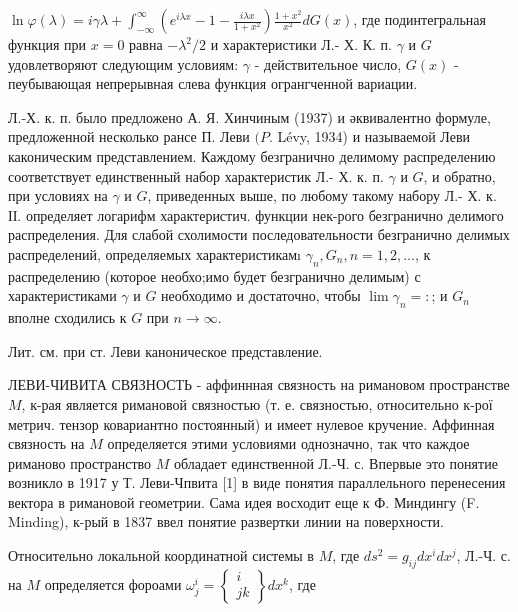 \documentclass[10pt]{article}
\begin{document}
$\ln \varphi(\lambda)=i \gamma \lambda+\int_{-\infty}^{\infty}\left(e^{i \lambda x}-1-\frac{i \lambda x}{1+x^{2}}\right) \frac{1+x^{2}}{x^{2}} d G(x)$, где подинтегральная функция при $x=0$ равна $-\lambda^{2} / 2$ и характеристики Л.- Х. К. п. $\gamma$ и $G$ удовлетворяют следующим условиям: $\gamma$ - действительное число, $G(x)$ - пеубывающая непрерывная слева функция огрангченной вариации.



Л.-Х. к. п. было предложено А. Я. Хинчиным (1937) и әквивалентно формуле, предложенной несколько рансе П. Леви $(P$. Lévy, 1934) и называемой Леви каконическим представлением. Каждому безгранично делимому распределению соответствует единственный набор характеристик Л.- Х. к. п. $\gamma$ и $G$, и обратно, при условиях на $\gamma$ и $G$, приведенных выше, по любому такому набору Л.- Х. к. ІІ. определяет логарифм характеристич. функции нек-рого безгранично делимого распределения. Для слабой схолимости последовательности безгранично делимых распределений, определяемых характеристикамı $\gamma_{n}, G_{n}, n=1,2, \ldots$, к распределению (которое необхо;имо будет безгранично делимым) с характеристиками $\gamma$ и $G$ необходимо и достаточно, чтобы $\lim \gamma_{n}=:$; и $G_{n}$ вполне сходились к $G$ при $n \rightarrow \infty$.



Лит. см. при ст. Леви каноническое представление.



ЛЕВИ-ЧИВИТА СВЯЗНОСТЬ - аффиннная связность на римановом пространстве $M$, к-рая является римановой связностью (т. е. связностью, относительно к-рої метрич. тензор ковариантно постоянный) и имеет нулевое кручение. Аффинная связность на $M$ определяется этими условиями однозначно, так что каждое риманово пространство $M$ обладает единственной Л.-Ч. с. Впервые это понятие возникло в 1917 у Т. Леви-Чпвита [1] в виде понятия параллельного перенесения вектора в римановой геометрии. Сама идея восходит еще к Ф. Миндингу (F. Minding), к-рый в 1837 ввел понятие развертки линии на поверхности.



Относительно локальной координатной системы в $M$, где $d s^{2}=g_{i j} d x^{i} d x^{j}$, Л.-Ч. с. на $M$ определяется фороами $\omega_{j}^{i}=\left\{\begin{array}{c}i \\ j k\end{array}\right\} d x^{k}$, где
\end{document}
